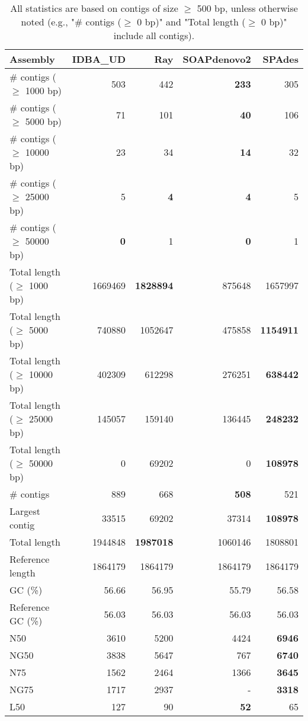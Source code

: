 \documentclass[12pt,a4paper]{article}
\begin{document}
\begin{table}[ht]
\begin{center}
\caption{All statistics are based on contigs of size $\geq$ 500 bp, unless otherwise noted (e.g., "\# contigs ($\geq$ 0 bp)" and "Total length ($\geq$ 0 bp)" include all contigs).}
\begin{tabular}{|l*{4}{|r}|}
\hline
Assembly & IDBA\_UD & Ray & SOAPdenovo2 & SPAdes \\ \hline
\# contigs ($\geq$ 1000 bp) & 503 & 442 & {\bf 233} & 305 \\ \hline
\# contigs ($\geq$ 5000 bp) & 71 & 101 & {\bf 40} & 106 \\ \hline
\# contigs ($\geq$ 10000 bp) & 23 & 34 & {\bf 14} & 32 \\ \hline
\# contigs ($\geq$ 25000 bp) & 5 & {\bf 4} & {\bf 4} & 5 \\ \hline
\# contigs ($\geq$ 50000 bp) & {\bf 0} & 1 & {\bf 0} & 1 \\ \hline
Total length ($\geq$ 1000 bp) & 1669469 & {\bf 1828894} & 875648 & 1657997 \\ \hline
Total length ($\geq$ 5000 bp) & 740880 & 1052647 & 475858 & {\bf 1154911} \\ \hline
Total length ($\geq$ 10000 bp) & 402309 & 612298 & 276251 & {\bf 638442} \\ \hline
Total length ($\geq$ 25000 bp) & 145057 & 159140 & 136445 & {\bf 248232} \\ \hline
Total length ($\geq$ 50000 bp) & 0 & 69202 & 0 & {\bf 108978} \\ \hline
\# contigs & 889 & 668 & {\bf 508} & 521 \\ \hline
Largest contig & 33515 & 69202 & 37314 & {\bf 108978} \\ \hline
Total length & 1944848 & {\bf 1987018} & 1060146 & 1808801 \\ \hline
Reference length & 1864179 & 1864179 & 1864179 & 1864179 \\ \hline
GC (\%) & 56.66 & 56.95 & 55.79 & 56.58 \\ \hline
Reference GC (\%) & 56.03 & 56.03 & 56.03 & 56.03 \\ \hline
N50 & 3610 & 5200 & 4424 & {\bf 6946} \\ \hline
NG50 & 3838 & 5647 & 767 & {\bf 6740} \\ \hline
N75 & 1562 & 2464 & 1366 & {\bf 3645} \\ \hline
NG75 & 1717 & 2937 & - & {\bf 3318} \\ \hline
L50 & 127 & 90 & {\bf 52} & 65 \\ \hline

\end{tabular}
\end{center}
\end{table}
\end{document}
